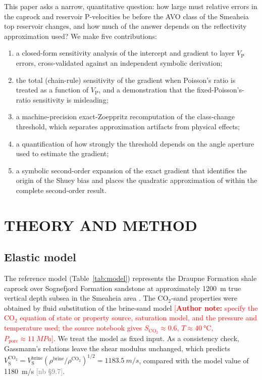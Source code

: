 \documentclass[11pt]{article}
\newcommand{\authornote}[1]{\textcolor{red}{[\textbf{Author note:} #1]}}
\newcommand{\VP}{V_\mathrm{P}}
\newcommand{\VS}{V_\mathrm{S}}
\newif\ifshownb \shownbtrue
\newcommand{\nb}[1]{\ifshownb\textcolor{gray}{[nb #1]}\fi}
\begin{document}
This paper asks a narrow, quantitative question: how large must relative errors in the caprock and reservoir P-velocities be before the AVO class of the Smeaheia top reservoir changes, and how much of the answer depends on the reflectivity approximation used? We make five contributions:
\begin{enumerate}
\item a closed-form sensitivity analysis of the \citet{shuey1985} intercept and gradient to layer $\VP$ errors, cross-validated against an independent symbolic derivation;
\item the total (chain-rule) sensitivity of the gradient when Poisson's ratio is treated as a function of $\VP$, and a demonstration that the fixed-Poisson's-ratio sensitivity is misleading;
\item a machine-precision exact-Zoeppritz \citep{zoeppritz1919} recomputation of the class-change threshold, which separates approximation artifacts from physical effects;
\item a quantification of how strongly the threshold depends on the angle aperture used to estimate the gradient;
\item a symbolic second-order expansion of the exact gradient that identifies the origin of the Shuey bias and places the quadratic approximation of \citet{wang1999} within the complete second-order result.
\end{enumerate}

\section*{THEORY AND METHOD}

\subsection*{Elastic model}

The reference model (Table~\ref{tab:model}) represents the Draupne Formation shale caprock over Sognefjord Formation sandstone at approximately \SI{1200}{m} true vertical depth subsea in the Smeaheia area \citep{fawad2021a,fawad2021b,hema2027}. The CO$_2$-sand properties were obtained by \citet{gassmann1951} fluid substitution of the brine-sand model \authornote{specify the CO$_2$ equation of state or property source, saturation model, and the pressure and temperature used; the source notebook gives $S_{\mathrm{CO_2}}\approx0.6$, $T\approx\SI{40}{\celsius}$, $P_\mathrm{pore}\approx\SI{11}{MPa}$}. We treat the model as fixed input. As a consistency check, Gassmann's relations leave the shear modulus unchanged, which predicts $\VS^{\mathrm{CO_2}}=\VS^{\mathrm{brine}}(\rho^{\mathrm{brine}}/\rho^{\mathrm{CO_2}})^{1/2}=\SI{1183.5}{m/s}$, compared with the model value of \SI{1180}{m/s} \nb{\S9.7}.
\end{document}
